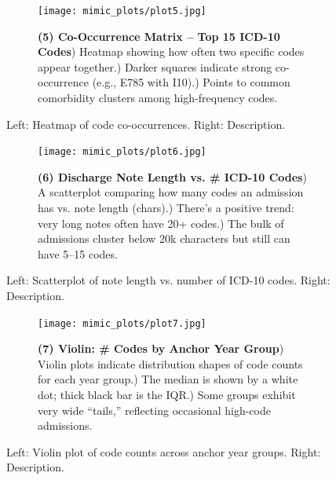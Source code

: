 \documentclass[12pt,a4paper]{report}
\begin{document}
\begin{figure}[ht!]
    \centering
    \begin{subfigure}{0.42\textwidth}
        \texttt{[image: mimic\_plots/plot5.jpg]}
    \end{subfigure}\hfill
    \begin{subfigure}{0.54\textwidth}
        \footnotesize
        \textbf{(5) Co-Occurrence Matrix -- Top 15 ICD-10 Codes}) Heatmap showing how often two specific codes appear together.) Darker squares indicate strong co-occurrence (e.g., E785 with I10).) Points to common comorbidity clusters among high-frequency codes.
    \end{subfigure}
    \caption{Left: Heatmap of code co-occurrences. Right: Description.}
    \label{fig:plot5}
\end{figure}

\begin{figure}[ht!]
    \centering
    \begin{subfigure}{0.42\textwidth}
        \texttt{[image: mimic\_plots/plot6.jpg]}
    \end{subfigure}\hfill
    \begin{subfigure}{0.54\textwidth}
        \footnotesize
        \textbf{(6) Discharge Note Length vs. \# ICD-10 Codes}) A scatterplot comparing how many codes an admission has vs. note length (chars).) There's a positive trend: very long notes often have 20+ codes.) The bulk of admissions cluster below 20k characters but still can have 5--15 codes.
    \end{subfigure}
    \caption{Left: Scatterplot of note length vs. number of ICD-10 codes. Right: Description.}
    \label{fig:plot6}
\end{figure}

\begin{figure}[ht!]
    \centering
    \begin{subfigure}{0.42\textwidth}
        \texttt{[image: mimic\_plots/plot7.jpg]}
    \end{subfigure}\hfill
    \begin{subfigure}{0.54\textwidth}
        \footnotesize
        \textbf{(7) Violin: \# Codes by Anchor Year Group}) Violin plots indicate distribution shapes of code counts for each year group.) The median is shown by a white dot; thick black bar is the IQR.) Some groups exhibit very wide “tails,” reflecting occasional high-code admissions.
    \end{subfigure}
    \caption{Left: Violin plot of code counts across anchor year groups. Right: Description.}
    \label{fig:plot7}
\end{figure}
\end{document}
